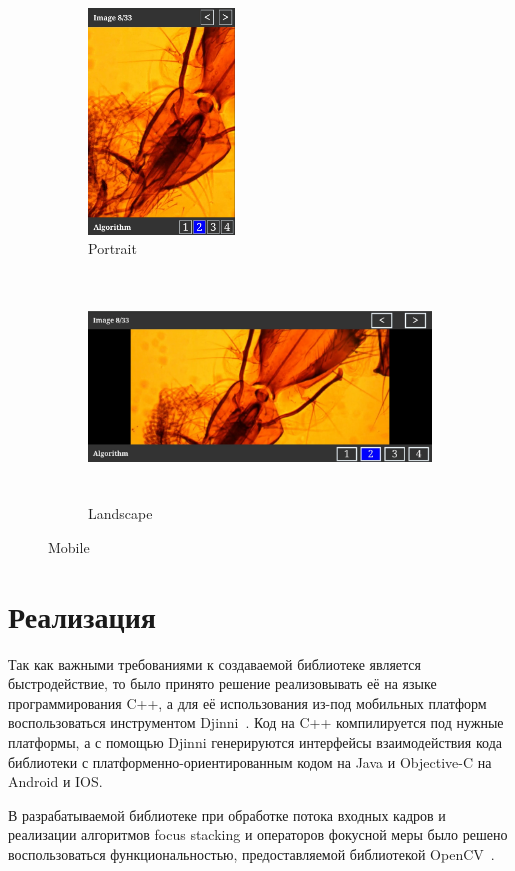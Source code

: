 \documentclass[14pt]{matmex-diploma-custom}
\begin{document}
\newpage

\begin{figure}[h]
    \begin{subfigure}{.25\textwidth}
        \centering
        \includegraphics[width=.9\linewidth,height=6cm]{figures/comparasion2.png}
        \caption{Portrait}
        \label{fig:sfig1}
    \end{subfigure}
    \begin{subfigure}{.75\textwidth}
        \centering
        \includegraphics[width=.9\linewidth,height=6cm]{figures/comparasion3.png}
        \caption{Landscape}
        \label{fig:sfig2}
    \end{subfigure}
    \caption{Mobile}
    \label{comparation2}
\end{figure}

\section{Реализация}

Так как важными требованиями к создаваемой библиотеке является быстродействие, то было принято решение реализовывать её на языке программирования C++, а для её использования из-под мобильных платформ воспользоваться инструментом Djinni~\cite{Djinni}. Код на C++ компилируется под нужные платформы, а с помощью Djinni генерируются интерфейсы взаимодействия кода библиотеки с платформенно-ориентированным кодом на Java и Objective-C на Android и IOS. 
\par
В разрабатываемой библиотеке при обработке потока входных кадров и реализации алгоритмов focus stacking и операторов фокусной меры было решено воспользоваться функциональностью, предоставляемой библиотекой OpenCV~\cite{OpenCV}.
\end{document}
